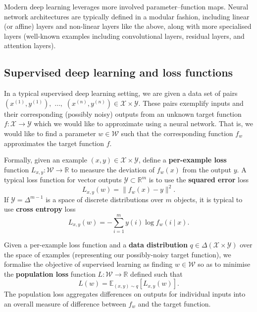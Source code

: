 \documentclass[11pt]{article}
\newcommand{\R}{\mathbb{R}}
\newcommand{\E}{\mathbb{E}}
\newcommand{\X}{\mathcal{X}}
\newcommand{\Y}{\mathcal{Y}}
\newcommand{\W}{\mathcal{W}}
\begin{document}
Modern deep learning leverages more involved parameter--function maps. Neural
network architectures are typically defined in a modular fashion, including
linear (or affine) layers and non-linear layers like the above, along with more
specialised layers (well-known examples including convolutional layers,
residual layers, and attention layers).

\subsection{Supervised deep learning and loss functions}

In a typical supervised deep learning setting, we are given a data set of pairs
    $(x^{(1)}, y^{(1)}),$ $\ldots,$ $(x^{(n)}, y^{(n)}) \in \X \times \Y$.
These pairs exemplify inputs and their corresponding (possibly noisy) outputs
from an unknown target function
    $f : \X \to \Y$
which we would like to approximate using a neural network. That is, we would
like to find a parameter $w \in \W$ such that the corresponding function $f_w$
approximates the target function $f$.

Formally, given an example $(x, y) \in \X \times \Y$, define a
\textbf{per-example loss} function
    $L_{x,y} : \W \to \R$
to measure the deviation of $f_w(x)$ from the output $y$. A typical loss
function for vector outputs $\Y \subset \R^m$ is to use the \textbf{squared
error} loss
\begin{equation}
    \label{eq:square-loss}
    L_{x,y}(w) = \|f_w(x) - y\|^2.
\end{equation}
If $\Y = \Delta^{m-1}$ is a space of discrete distributions over $m$ objects, it
is typical to use \textbf{cross entropy} loss
\begin{equation}
    \label{eq:cross-entropy}
    L_{x,y}(w) = - \sum_{i=1}^m y(i) \log f_w(i \mid x).
\end{equation}

Given a per-example loss function and a \textbf{data distribution}
    $q \in \Delta(\X\times\Y)$
over the space of examples (representing our possibly-noisy target function),
we formalise the objective of supervised learning as finding $w \in \W$ so as
to minimise the \textbf{population loss} function
    $L : \W \to \R$
defined such that
\begin{equation}
    L(w) = \E_{(x,y) \sim q}[L_{x,y}(w)].
\end{equation}
The population loss aggregates differences on outputs for individual inputs
into an overall measure of difference between $f_w$ and the target function.
\end{document}
